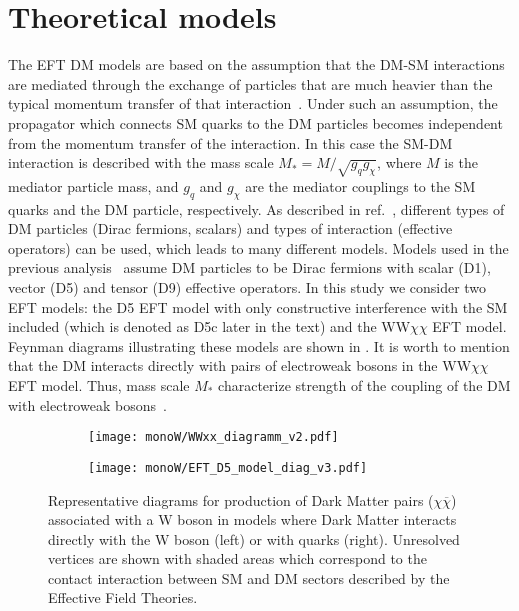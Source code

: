 \section{Theoretical models}

The EFT DM models are based on the assumption that 
the DM-SM interactions are mediated through the exchange of particles that are much heavier than the typical momentum transfer of that interaction~\cite{arXiv:1512.00476}.
Under such an assumption, the propagator which connects SM quarks to the DM particles becomes independent from the momentum transfer of the interaction. In this case the SM-DM interaction is described with the mass scale $M_{*} = M/\sqrt{g_q g_{\chi}}$, where $M$ is the mediator particle mass, and $g_q$ and $g_{\chi}$ are the mediator couplings to the SM quarks and the DM particle, respectively. As described in ref.~\cite{dm_eft_models}, different types of DM particles (Dirac fermions, scalars) and types of interaction (effective operators) can be used, which leads to many different models.
Models used in the previous analysis~\cite{wprime_8TeV} assume DM particles to be Dirac fermions with scalar (D1), vector (D5) and tensor (D9) effective operators.
In this study we consider two EFT models: the D5 EFT model with only constructive interference with the SM included (which is denoted as D5c later in the text) and the WW$\chi\chi$ EFT model.
Feynman diagrams illustrating these models are shown in .
It is worth to mention that the DM interacts directly with pairs of electroweak bosons in the WW$\chi\chi$ EFT model. Thus, mass scale $M_{*}$ characterize strength of the coupling of the DM with electroweak bosons~\cite{EFT_WWxx_description}.

\begin{figure}[]

\centering
\begin{subfigure}{.5\textwidth}
  \centering
  \texttt{[image: monoW/WWxx\_diagramm\_v2.pdf]}
\end{subfigure}%
\begin{subfigure}{.5\textwidth}
  \centering
  \texttt{[image: monoW/EFT\_D5\_model\_diag\_v3.pdf]}
\end{subfigure}
  \caption{Representative diagrams for production of Dark Matter pairs ($\chi\overline{\chi}$) associated with a W boson in models where
Dark Matter interacts directly with the W boson (left) or with quarks (right).
Unresolved vertices are shown with shaded areas which correspond to the 
contact interaction between SM and DM sectors described by the Effective Field Theories.
}
  \label{fig:feynMonoWEFT}
\end{figure}


